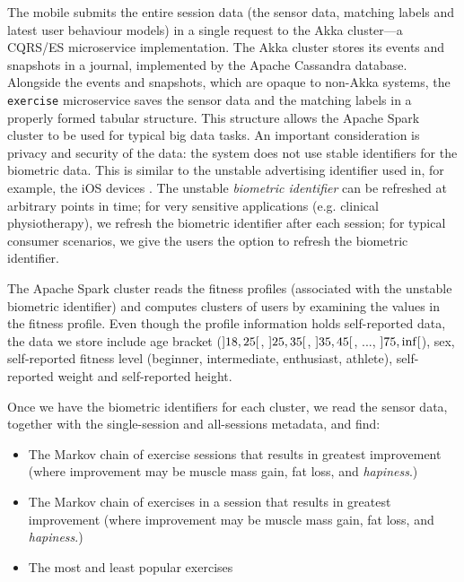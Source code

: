 \documentclass[a4paper, 10 pt, conference]{IEEEtran}
\begin{document}
The mobile submits the entire session data (the sensor data, matching labels and latest user behaviour models) in a single request to the Akka \cite{akka} cluster---a CQRS/ES \cite{cqrs-es} microservice implementation. The Akka cluster stores its events and snapshots in a journal, implemented by the Apache Cassandra \cite{apache-cassandra} database. Alongside the events and snapshots, which are opaque to non-Akka systems, the \texttt{exercise} microservice saves the sensor data and the matching labels in a properly formed tabular structure. This structure allows the Apache Spark \cite{apache-spark} cluster to be used for typical big data tasks. An important consideration is privacy and security of the data: the system does not use stable identifiers for the biometric data. This is similar to the unstable advertising identifier used in, for example, the iOS devices \cite{ios-advertising-identifier}. The unstable \emph{biometric identifier} can be refreshed at arbitrary points in time; for very sensitive applications (e.g. clinical physiotherapy), we refresh the biometric identifier after each session; for typical consumer scenarios, we give the users the option to refresh the biometric identifier.

The Apache Spark cluster reads the fitness profiles (associated with the unstable biometric identifier) and computes clusters of users by examining the values in the fitness profile. Even though the profile information holds self-reported data, the data we store include age bracket ($\interval[open]{18}{25}$, $\interval[open]{25}{35}$, $\interval[open]{35}{45}$, ..., $\interval[open]{75}{\inf}$), sex, self-reported fitness level (beginner, intermediate, enthusiast, athlete), self-reported weight and self-reported height.

Once we have the biometric identifiers for each cluster, we read the sensor data, together with the single-session and all-sessions metadata, and find:

\begin{itemize}
\item The Markov chain of exercise sessions that results in greatest improvement (where improvement may be muscle mass gain, fat loss, and \emph{hapiness}.)
\item The Markov chain of exercises in a session that results in greatest improvement (where improvement may be muscle mass gain, fat loss, and \emph{hapiness}.)
\item The most and least popular exercises
\end{itemize}
\end{document}
